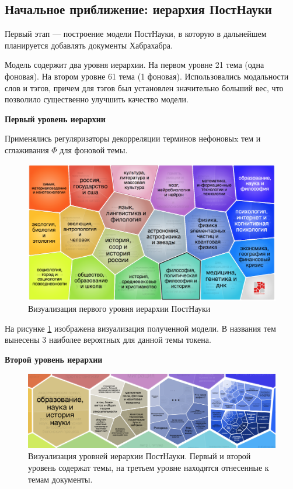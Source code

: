 \subsection{Начальное приближение: иерархия ПостНауки} 

Первый этап --- построение модели ПостНауки, в которую в дальнейшем планируется добавлять документы Хабрахабра. 

 Модель содержит два уровня иерархии. На первом уровне 21 тема (одна фоновая). На втором уровне 61 тема (1 фоновая). Использовались модальности слов и тэгов, причем для тэгов был установлен значительно больший вес, что позволило существенно улучшить качество модели.

\textbf{Первый уровень иерархии}

Применялись регуляризаторы декорреляции терминов нефоновыx тем и сглаживания $\Phi$ для фоновой темы.

\begin{figure}[h]
    \centering 
    \includegraphics[width=1\textwidth]{img/pn_level0.png}
    \caption{\label{fig:pn_level0}Визуализация первого уровня иерархии ПостНауки}
\end{figure}

На рисунке \ref{fig:pn_level0} изображена визуализация полученной модели. В названия тем вынесены 3 наиболее вероятных для данной темы токена. 


\textbf{Второй уровень иерархии}
 
\begin{figure}[h]
    \centering 
    \includegraphics[width=1\textwidth]{img/pn_level1.png}
    \caption{\label{fig:pn_level1}Визуализация уровней иерархии ПостНауки. Первый и второй уровень содержат темы, на третьем уровне находятся отнесенные к темам документы.}
    \end{figure}

